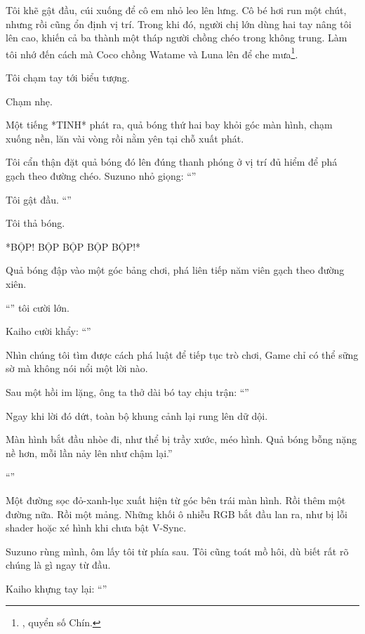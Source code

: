 \documentclass[../main.tex]{subfiles}
\begin{document}
Tôi khẽ gật đầu, cúi xuống để cô em nhỏ leo lên lưng. Cô bé hơi run một chút, nhưng rồi cũng ổn định vị trí. Trong khi đó, người chị lớn dùng hai tay nâng tôi lên cao, khiến cả ba thành một tháp người chồng chéo trong không trung. Làm tôi nhớ đến cách mà Coco chồng Watame và Luna lên để che mưa\footnote{, quyển số Chín.}.

Tôi chạm tay tới biểu tượng.

Chạm nhẹ.

Một tiếng *TINH* phát ra, quả bóng thứ hai bay khỏi góc màn hình, chạm xuống nền, lăn vài vòng rồi nằm yên tại chỗ xuất phát.

Tôi cẩn thận đặt quả bóng đó lên đúng thanh phóng ở vị trí đủ hiểm để phá gạch theo đường chéo. Suzuno nhỏ giọng: ``''

Tôi gật đầu. ``''

Tôi thả bóng.

*BỘP! BỘP BỘP BỘP BỘP!*

Quả bóng đập vào một góc bảng chơi, phá liên tiếp năm viên gạch theo đường xiên.

``'' tôi cười lớn.

Kaiho cười khẩy: ``''

Nhìn chúng tôi tìm được cách phá luật để tiếp tục trò chơi, Game chỉ có thể sững sờ mà không nói nổi một lời nào.

Sau một hồi im lặng, ông ta thở dài bó tay chịu trận: ``''

Ngay khi lời đó dứt, toàn bộ khung cảnh lại rung lên dữ dội.

Màn hình bắt đầu nhòe đi, như thể bị trầy xước, méo hình. Quả bóng bỗng nặng nề hơn, mỗi lần nảy lên như chậm lại.''

``''

Một đường sọc đỏ-xanh-lục xuất hiện từ góc bên trái màn hình. Rồi thêm một đường nữa. Rồi một mảng. Những khối ô nhiễu RGB bắt đầu lan ra, như bị lỗi shader hoặc xé hình khi chưa bật V-Sync.


Suzuno rùng mình, ôm lấy tôi từ phía sau. Tôi cũng toát mồ hôi, dù biết rất rõ chúng là gì ngay từ đầu.

Kaiho khựng tay lại: ``''
\end{document}
